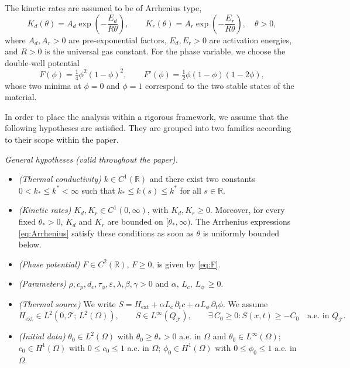 \documentclass[final,1p,times]{elsarticle}
\numberwithin{equation}{section}
\newcommand{\ptn}{\partial_t}
\begin{document}
	The kinetic rates are assumed to be of Arrhenius type,
	\begin{equation}
		\label{eq:Arrhenius}
		K_d(\theta) = A_d \exp\!\left(-\frac{E_d}{R\theta}\right),
		\qquad
		K_r(\theta) = A_r \exp\!\left(-\frac{E_r}{R\theta}\right),
		\quad \theta > 0,
	\end{equation}
	where $A_d, A_r > 0$ are pre-exponential factors, $E_d, E_r > 0$ are activation energies, and $R > 0$ is the universal gas constant. For the phase variable, we choose the double-well potential
	\begin{equation}
		\label{eq:F}
		F(\phi) = \tfrac{1}{4}\phi^2(1-\phi)^2, \qquad
		F'(\phi) = \tfrac{1}{2}\phi(1-\phi)(1-2\phi),
	\end{equation}
	whose two minima at $\phi = 0$ and $\phi = 1$ correspond to the two stable states of the material.
	
	In order to place the analysis within a rigorous framework, we assume that the following hypotheses are satisfied. They are grouped into two families according to their scope within the paper.
	
	\smallskip
	\noindent\textit{General hypotheses (valid throughout the paper).}
	
	\begin{itemize}
		\item[\textbf{(H1)}] \textit{(Thermal conductivity)}
		$k\in C^1(\mathbb R)$ and there exist two constants $0<k_*\le k^*<\infty$ such that
		$k_*\le k(s)\le k^*$ for all $s\in\mathbb R$.
		
		\item[\textbf{(H2)}] \textit{(Kinetic rates)}
		$K_d,K_r\in C^1(0,\infty)$, with $K_d,K_r\ge 0$. Moreover, for every fixed $\theta_*>0$, $K_d$ and $K_r$ are bounded on $[\theta_*,\infty)$. The Arrhenius expressions \eqref{eq:Arrhenius} satisfy these conditions as soon as $\theta$ is uniformly bounded below.
		
		\item[\textbf{(H3)}] \textit{(Phase potential)}
		$F\in C^2(\mathbb R)$, $F\ge 0$, is given by \eqref{eq:F}.
		
		\item[\textbf{(H4)}] \textit{(Parameters)}
		$\rho,c_p,d_c,\tau_\phi,\varepsilon,\lambda,\beta,\gamma>0$ and $\alpha, \, L_c, \, L_{\phi} \, \ge 0$.
		
		\item[\textbf{(H5)}] \textit{(Thermal source)}
		We write $S = H_{\mathrm{ext}} + \alpha L_c\,\ptn c + \alpha L_\phi\,\ptn\phi$.
		We assume
		\[
		H_{\mathrm{ext}} \in L^2(0,\mathcal{T};\,L^2(\Omega)),
		\qquad
		S \in L^\infty(Q_{\mathcal{T}}),
		\qquad
		\exists\, C_0 \geq 0 \colon S(x,t) \geq -C_0
		\quad \text{a.e. in } Q_{\mathcal{T}}.
		\]
		
		\item[\textbf{(H6)}] \textit{(Initial data)}
		$\theta_0\in L^2(\Omega)$ with $\theta_0\ge\theta_*>0$ a.e. in $\Omega$ and $\theta_0 \in L^\infty(\Omega)$;
		$c_0\in H^1(\Omega)$ with $0\le c_0\le 1$ a.e. in $\Omega$;
		$\phi_0\in H^1(\Omega)$ with $0\le\phi_0\le 1$ a.e. in $\Omega$.
		
	\end{itemize}
	
\end{document}
